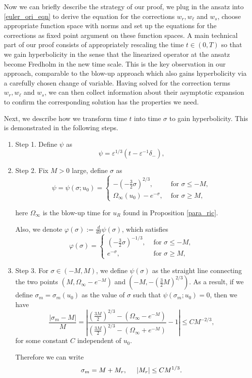 \documentclass[letterpaper,11pt]{article}
\newcommand{\eps}{\varepsilon}
\numberwithin{equation}{section}
\theoremstyle{plain}
\begin{document}
Now we can briefly describe the strategy of our proof, we plug in the ansatz into \eqref{euler_ori_eqn} to derive the equation for the corrections $w_r, w_\ell $ and $w_s$, choose appropriate function space with norms and set up the equations for the corrections as fixed point argument on these function spaces. A main technical part of our proof consists of appropriately rescaling the time $t \in (0,T)$ so that we gain hyperbolicity in the sense that the linearized operator at the ansatz become Fredholm in the new time scale. This is the key observation in our approach, comparable to the blow-up approach which also gains hyperbolicity via a carefully chosen change of variable. Having solved for the correction terms $w_r, w_\ell$ and $w_s$, we can then collect information about their asymptotic expansion to confirm the corresponding solution has the properties we need.


Next, we describe how we transform time $t$ into time $\sigma$ to gain hyperbolicity. This is demonstrated in the following steps.
\begin{enumerate}
\item Step 1. Define $\psi$ as
\[
\psi = \eps^{1/3}(t - \eps^{-1}\delta_-),
\]

\item Step 2.
Fix $M>0$ large, define $\sigma$ as
\begin{equation} \label{psi_def}
\psi = \psi(\sigma; u_0) =\begin{cases}
-(-\frac{3}{2} \sigma)^{2/3} , &\text{ for }\sigma \le -M, \\
\Omega_\infty(u_0) -e^{-\sigma}, &\text{ for }\sigma \ge M,
\end{cases}
\end{equation}

here $\Omega_\infty$ is the blow-up time for $u_R$ found in Proposition \ref{para_ric}.

Also, we denote $\varphi(\sigma) := \frac{d}{d\sigma}\psi(\sigma)$, which satisfies
\begin{equation} \label{phi_def}
\varphi(\sigma)  =\begin{cases}
(-\frac{3}{2} \sigma)^{-1/3} , &\text{ for }\sigma \le -M, \\
e^{-\sigma}, &\text{ for }\sigma \ge M,
\end{cases}
\end{equation}
\item Step 3. For $\sigma \in (-M, M)$, we define $\psi(\sigma)$ as the straight line connecting the two points $(M, \Omega_\infty-e^{-M})$ and $(-M, -(\frac{3}{2}M)^{2/3})$. As a result, if we define $\sigma_m=\sigma_m(u_0)$ as the value of $\sigma$ such that $\psi(\sigma_m; u_0) = 0$, then we have 
\[
\frac{|\sigma_m - M|}{M} = \left| \frac{(\frac{3M}{2})^{2/3}-(\Omega_\infty-e^{-M})}{(\frac{3M}{2})^{2/3}-(\Omega_\infty+e^{-M})} -1 \right|\le CM^{-2/3},
\] 
for some constant $C$ independent of $u_0$.

Therefore we can write
\begin{equation}\label{sigm_asy}
\sigma_m = M + M_r, \hspace{0.2in} |M_r| \le CM^{1/3}.
\end{equation}
\end{enumerate}
\end{document}
